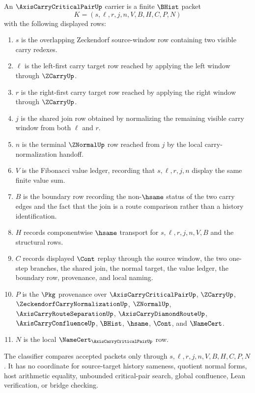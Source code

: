 \begin{definition}
\label{def:axis-carry-critical-pair-carrier}
An $\AxisCarryCriticalPairUp$ carrier is a finite $\BHist$ packet
$$
K=(s,\ell,r,j,n,V,B,H,C,P,N)
$$
with the following displayed rows:
\begin{enumerate}
\item $s$ is the overlapping Zeckendorf source-window row containing two visible carry redexes.
\item $\ell$ is the left-first carry target row reached by applying the left window through $\ZCarryUp$.
\item $r$ is the right-first carry target row reached by applying the right window through $\ZCarryUp$.
\item $j$ is the shared join row obtained by normalizing the remaining visible carry window from both $\ell$ and $r$.
\item $n$ is the terminal $\ZNormalUp$ row reached from $j$ by the local carry-normalization handoff.
\item $V$ is the Fibonacci value ledger, recording that $s,\ell,r,j,n$ display the same finite value sum.
\item $B$ is the boundary row recording the non-$\hsame$ status of the two carry edges and the fact that the join is a route comparison rather than a history identification.
\item $H$ records componentwise $\hsame$ transport for $s,\ell,r,j,n,V,B$ and the structural rows.
\item $C$ records displayed $\Cont$ replay through the source window, the two one-step branches, the shared join, the normal target, the value ledger, the boundary row, provenance, and local naming.
\item $P$ is the $\Pkg$ provenance over $\AxisCarryCriticalPairUp$, $\ZCarryUp$, $\ZeckendorfCarryNormalizationUp$, $\ZNormalUp$, $\AxisCarryRouteSeparationUp$, $\AxisCarryDiamondRouteUp$, $\AxisCarryConfluenceUp$, $\BHist$, $\hsame$, $\Cont$, and $\NameCert$.
\item $N$ is the local $\NameCert_{\AxisCarryCriticalPairUp}$ row.
\end{enumerate}
The classifier compares accepted packets only through $s,\ell,r,j,n,V,B,H,C,P,N$. It has no coordinate for source-target history sameness, quotient normal forms, host arithmetic equality, unbounded critical-pair search, global confluence, Lean verification, or bridge checking.
\end{definition}

